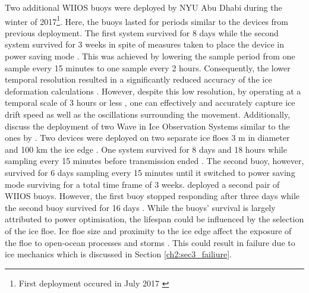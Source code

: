 Two additional WIIOS buoys were deployed by NYU Abu Dhabi \cite{vichi2019effects,alberello2019drift} during the winter of 2017\footnote{First deployment occured in July 2017 \cite{vichi2019effects,alberello2019drift}}. Here, the buoys lasted for periods similar to the devices from previous deployment. The first system survived for 8 days while the second system survived for 3 weeks in spite of measures taken to place the device in power saving mode \cite{vichi2019effects,alberello2019drift}. This was achieved by lowering the sample period from  one sample every 15 minutes to one sample every 2 hours. Consequently, the lower temporal resolution resulted in a significantly reduced accuracy of the ice deformation calculations \cite{vichi2019effects,alberello2019drift}. However, despite this low resolution, by operating at a temporal scale of 3 hours or less \cite{vichi2019effects,alberello2019drift}, one can effectively and accurately capture ice drift speed as well as the oscillations surrounding the movement. Additionally, \textcite{vichi2019effects,albarello2020drift} discuss the deployment of two Wave in Ice Observation Systems similar to the ones by \cite{kohout2015device}. Two devices were deployed on two separate ice floes 3 m in diameter and 100 km  the ice edge \cite{vichi2019effects,albarello2020drift}. One system survived for 8 days and 18 hours while sampling every 15 minutes before transmission ended \cite{vichi2019effects,albarello2020drift}. The second buoy, however, survived for 6 days sampling every 15 minutes until it switched to power saving mode surviving for a total time frame of 3 weeks. \textcite{vichi2019effects,alberello2019drift} deployed a second pair of WIIOS buoys. However, the first buoy stopped responding after three days while the second buoy survived for 16 days \cite{vichi2019effects}. While the buoys' survival is largely attributed to power optimisation, the lifespan could be influenced by the selection of the ice floe. Ice floe size and proximity to the ice edge affect the exposure of the floe to open-ocean processes and storms \cite{vichi2019effects}. This could result in failure due to ice mechanics which is discussed in Section \ref{ch2:sec3_failiure}. \par 

